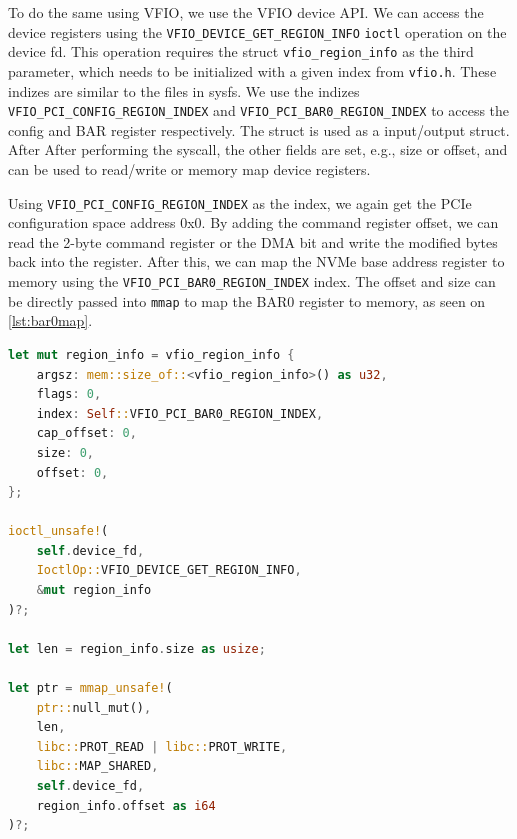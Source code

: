 To do the same using VFIO, we use the VFIO device API.
We can access the device registers using the \texttt{VFIO\_DEVICE\_GET\_REGION\_INFO} \texttt{ioctl} operation on the device fd. This operation requires the struct \texttt{vfio\_region\_info} as the third parameter, which needs to be initialized with a given index from \texttt{vfio.h}.
These indizes are similar to the files in sysfs. We use the indizes \texttt{VFIO\_PCI\_CONFIG\_REGION\_INDEX} and \texttt{VFIO\_PCI\_BAR0\_REGION\_INDEX} to access the config and BAR register respectively. The struct is used as a input/output struct. After
After performing the syscall, the other fields are set, e.g., size or offset, and can be used to read/write or memory map device registers.

Using \texttt{VFIO\_PCI\_CONFIG\_REGION\_INDEX} as the index, we again get the PCIe configuration space address 0x0. By adding the command register offset, we can read the 2-byte command register or the DMA bit and write the modified bytes back into the register.
After this, we can map the NVMe base address register to memory using the \texttt{VFIO\_PCI\_BAR0\_REGION\_INDEX} index.
The offset and size can be directly passed into \texttt{mmap} to map the BAR0 register to memory, as seen on \autoref{lst:bar0map}.

\begin{minipage}{.95\linewidth}
    \begin{lstlisting}[language=Rust,caption={Mapping the BAR0 NVMe register to memory}, label=lst:bar0map]
let mut region_info = vfio_region_info {
    argsz: mem::size_of::<vfio_region_info>() as u32,
    flags: 0,
    index: Self::VFIO_PCI_BAR0_REGION_INDEX,
    cap_offset: 0,
    size: 0,
    offset: 0,
};

ioctl_unsafe!(
    self.device_fd,
    IoctlOp::VFIO_DEVICE_GET_REGION_INFO,
    &mut region_info
)?;

let len = region_info.size as usize;

let ptr = mmap_unsafe!(
    ptr::null_mut(),
    len,
    libc::PROT_READ | libc::PROT_WRITE,
    libc::MAP_SHARED,
    self.device_fd,
    region_info.offset as i64
)?; 
\end{lstlisting}
\end{minipage}

